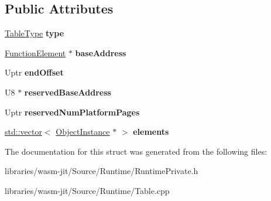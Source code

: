 \subsection*{Public Attributes}
\begin{DoxyCompactItemize}
\item 
\mbox{\label{struct_runtime_1_1_table_instance_a8c2b83504d64ab8b6d6712f218dcbbaf}} 
\mbox{\hyperlink{struct_i_r_1_1_table_type}{Table\+Type}} {\bfseries type}
\item 
\mbox{\label{struct_runtime_1_1_table_instance_a0cc294ff380a59a1a412271baae6654f}} 
\mbox{\hyperlink{struct_runtime_1_1_table_instance_1_1_function_element}{Function\+Element}} $\ast$ {\bfseries base\+Address}
\item 
\mbox{\label{struct_runtime_1_1_table_instance_a3839bbbde61652dde5aebc572e7c9df3}} 
Uptr {\bfseries end\+Offset}
\item 
\mbox{\label{struct_runtime_1_1_table_instance_a7f1e2f643f47d8643fb808a6867c22b1}} 
U8 $\ast$ {\bfseries reserved\+Base\+Address}
\item 
\mbox{\label{struct_runtime_1_1_table_instance_abbeb67176f883b3dad77bc0d7f68ca40}} 
Uptr {\bfseries reserved\+Num\+Platform\+Pages}
\item 
\mbox{\label{struct_runtime_1_1_table_instance_ab08261931c02a14bad7616c3712139d8}} 
\mbox{\hyperlink{classstd_1_1vector}{std\+::vector}}$<$ \mbox{\hyperlink{struct_runtime_1_1_object_instance}{Object\+Instance}} $\ast$ $>$ {\bfseries elements}
\end{DoxyCompactItemize}


The documentation for this struct was generated from the following files\+:\begin{DoxyCompactItemize}
\item 
libraries/wasm-\/jit/\+Source/\+Runtime/Runtime\+Private.\+h\item 
libraries/wasm-\/jit/\+Source/\+Runtime/Table.\+cpp\end{DoxyCompactItemize}
